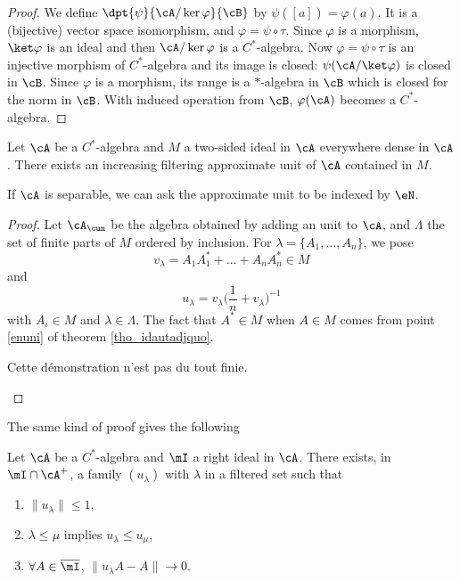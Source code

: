 \begin{proof}
We  define $\dpt{\psi}{\cA/\ker\varphi}{\cB}$ by $\psi([a])=\varphi(a)$. It is a (bijective) vector space isomorphism, and $\varphi=\psi\circ\tau$. Since $\varphi$ is a morphism, $\ket \varphi$ is an ideal and then $\cA/\ker\varphi$ is a $C^*$-algebra. Now $\varphi=\psi\circ\tau$ is an injective morphism of $C^*$-algebra and its image is closed: $\psi(\cA/\ket\varphi)$ is closed in $\cB$. Since $\varphi$ is a morphism, its range is a $*$-algebra in $\cB$ which is closed for the norm in $\cB$. With induced operation from $\cB$, $\varphi(\cA)$ becomes a $C^*$-algebra.
\end{proof}


\begin{proposition} 
Let $\cA$ be a $C^*$-algebra  and $M$ a two-sided ideal in $\cA$ everywhere dense in $\cA$. There exists an increasing filtering approximate unit of $\cA$ contained in $M$.

If $\cA$ is separable, we can ask the approximate unit to be indexed by $\eN$.

\end{proposition}
\begin{proof}
Let $\cA_{\cun}$ be the algebra obtained by adding an unit to $\cA$, and $\Lambda$ the set of finite parts of $M$ ordered by inclusion. For $\lambda=\{ A_1,\ldots, A_n \}$, we pose
\[ 
  v_{\lambda}=A_1A_1^*+\ldots+A_nA_n^*\in M
\]
 and 
\[ 
  u_{\lambda}=v_{\lambda}\big( \frac{1}{ n }+v_{\lambda} \big)^{-1}
\]
with $A_i\in M$ and $\lambda\in\Lambda$. The fact that $A^*\in M$ when $A\in M$ comes from point \ref{enuni} of theorem \ref{tho_idautadjquo}.

\begin{probleme}
Cette démonstration n'est pas du tout finie.
\end{probleme}

\end{proof}

The same kind of proof gives the following

\begin{proposition}
Let $\cA$ be a $C^{*}$-algebra and $\mI$ a right ideal in $\cA$. There exists, in $\mI\cap\cA^+$, a family $(u_{\lambda})$ with $\lambda$ in a filtered set such that
\begin{enumerate}
\item $\|u_{\lambda}\|\leq 1$,
\item $\lambda\leq\mu$ implies $u_{\lambda}\leq u_{\mu}$,
\item $\forall A\in\overline{\mI}$, $\|u_{\lambda} A-A\|\to 0$.
\end{enumerate}
\end{proposition}

